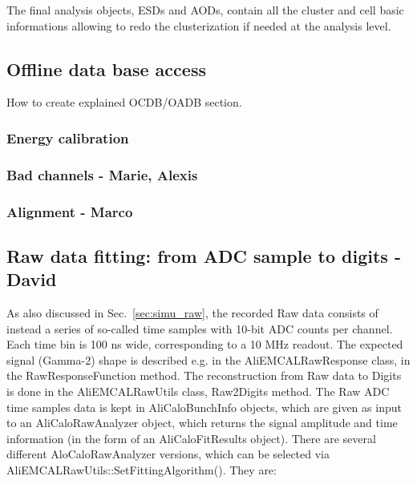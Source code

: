 The final analysis objects, ESDs and AODs, contain all the cluster and cell basic informations allowing to redo the clusterization if needed at the analysis level.



\subsection{Offline data base access}

How to create explained OCDB/OADB section.

\subsubsection{Energy calibration}

\subsubsection{Bad channels - Marie, Alexis}

\subsubsection{Alignment - Marco}

\subsection{Raw data fitting: from ADC sample to digits - David}

As also discussed in Sec.~\ref{sec:simu_raw}, the recorded Raw data consists
of instead a series of so-called time samples with 10-bit ADC counts per channel. 
Each time bin is 100 ns wide, corresponding to a 10 MHz readout.
The expected signal (Gamma-2) shape is described e.g. in the AliEMCALRawResponse class,
in the RawResponseFunction method.
The reconstruction from Raw data to Digits is done in the AliEMCALRawUtils class,
Raw2Digits method.
The Raw ADC time samples data is kept in AliCaloBunchInfo objects, which are given
as input to an AliCaloRawAnalyzer object, which returns the signal amplitude and time
information (in the form of an AliCaloFitResults object).
There are several different AloCaloRawAnalyzer versions, which can be selected via
AliEMCALRawUtils::SetFittingAlgorithm(). They are:

